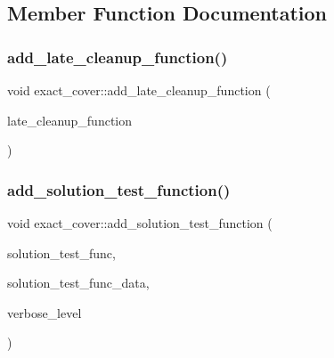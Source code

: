 \subsection{Member Function Documentation}
\mbox{\label{classexact__cover_aff4169e2c7db2c98736c5d59c486a1d0}} 
\subsubsection{\texorpdfstring{add\+\_\+late\+\_\+cleanup\+\_\+function()}{add\_late\_cleanup\_function()}}
{\footnotesize\ttfamily void exact\+\_\+cover\+::add\+\_\+late\+\_\+cleanup\+\_\+function (\begin{DoxyParamCaption}\item[{void($\ast$)(\mbox{\hyperlink{classexact__cover}{exact\+\_\+cover}} $\ast$E, \mbox{\hyperlink{galois_8h_a09fddde158a3a20bd2dcadb609de11dc}{I\+NT}} starter\+\_\+case, \mbox{\hyperlink{galois_8h_a09fddde158a3a20bd2dcadb609de11dc}{I\+NT}} \mbox{\hyperlink{simeon_8_c_a818073fbcc2f439e7c56952f67386122}{verbose\+\_\+level}})}]{late\+\_\+cleanup\+\_\+function }\end{DoxyParamCaption})}

\mbox{\label{classexact__cover_a53ef396371afebb15465d243e21d3cfc}} 
\subsubsection{\texorpdfstring{add\+\_\+solution\+\_\+test\+\_\+function()}{add\_solution\_test\_function()}}
{\footnotesize\ttfamily void exact\+\_\+cover\+::add\+\_\+solution\+\_\+test\+\_\+function (\begin{DoxyParamCaption}\item[{\mbox{\hyperlink{galois_8h_a09fddde158a3a20bd2dcadb609de11dc}{I\+NT}}($\ast$)(\mbox{\hyperlink{classexact__cover}{exact\+\_\+cover}} $\ast$EC, \mbox{\hyperlink{galois_8h_a09fddde158a3a20bd2dcadb609de11dc}{I\+NT}} $\ast$\mbox{\hyperlink{simeon_8_c_adab47f8243f1b5a2c31df2535d6b37d0}{S}}, \mbox{\hyperlink{galois_8h_a09fddde158a3a20bd2dcadb609de11dc}{I\+NT}} len, void $\ast$data, \mbox{\hyperlink{galois_8h_a09fddde158a3a20bd2dcadb609de11dc}{I\+NT}} \mbox{\hyperlink{simeon_8_c_a818073fbcc2f439e7c56952f67386122}{verbose\+\_\+level}})}]{solution\+\_\+test\+\_\+func,  }\item[{void $\ast$}]{solution\+\_\+test\+\_\+func\+\_\+data,  }\item[{\mbox{\hyperlink{galois_8h_a09fddde158a3a20bd2dcadb609de11dc}{I\+NT}}}]{verbose\+\_\+level }\end{DoxyParamCaption})}

